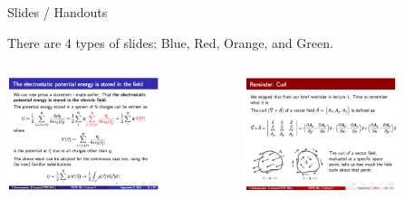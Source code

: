 %
%
%

\begin{frame}{Slides / Handouts}

There are 4 types of slides:
{\color{darkpowderblue} Blue}, {\color{dBG1} Red},
{\color{eBG1} Orange}, and {\color{pBG1} Green}.

\begin{columns}
  \begin{column}{0.50\textwidth}
   \begin{center}
     \includegraphics[width=0.7\textwidth]{./images/example_slides/main.png}\\
   \end{center}
  \end{column}
  \begin{column}{0.50\textwidth}
   \begin{center}
     \includegraphics[width=0.7\textwidth]{./images/example_slides/reminder.png}\\
   \end{center}
  \end{column}
\end{columns}


\end{frame}
